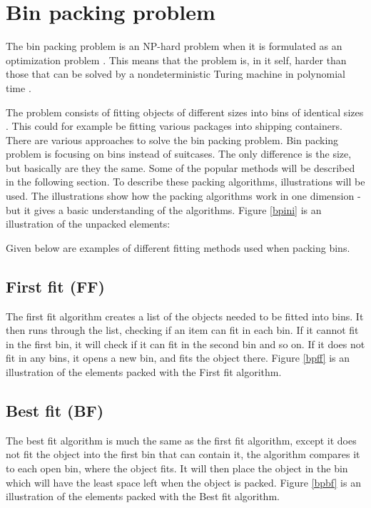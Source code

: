 \section{Bin packing problem}
\label{sec:binpacking}

The bin packing problem is an NP-hard problem when it is formulated as an optimization problem \citep{binpackinggsu}. This means that the problem is, in it self, harder than those that can be solved by a nondeterministic Turing machine in polynomial time \citep{nphardnist}.


The problem consists of fitting objects of different sizes into bins of identical sizes \citep{appofdismath}. This could for example be fitting various packages into shipping containers. There are various approaches to solve the bin packing problem. Bin packing problem is focusing on bins instead of suitcases. The only difference is the size, but basically are they the same. Some of the popular methods will be described in the following section. To describe these packing algorithms, illustrations will be used. The illustrations show how the packing algorithms work in one dimension - but it gives a basic understanding of the algorithms. Figure \ref{bpini} is an illustration of the unpacked elements:

Given below are examples of different fitting methods used when packing bins.

\subsection{First fit (FF)}
The first fit algorithm creates a list of the objects needed to be fitted into bins. It then runs through the list, checking if an item can fit in each bin. If it cannot fit in the first bin, it will check if it can fit in the second bin and so on. If it does not fit in any bins, it opens a new bin, and fits the object there. Figure \ref{bpff} is an illustration of the elements packed with the First fit algorithm.

\subsection{Best fit (BF)}
The best fit algorithm is much the same as the first fit algorithm, except it does not fit the object into the first bin that can contain it, the algorithm compares it to each open bin, where the object fits. It will then place the object in the bin which will have the least space left when the object is packed. Figure \ref{bpbf} is an illustration of the elements packed with the Best fit algorithm.

